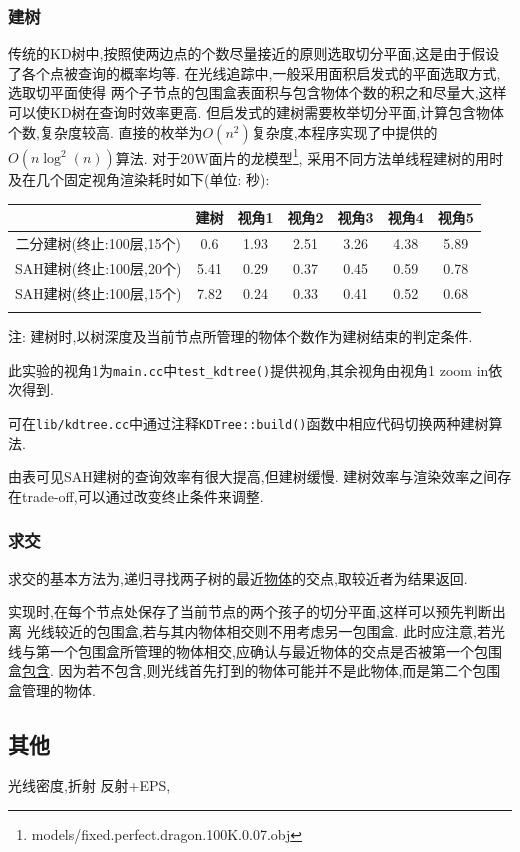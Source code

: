 \subsubsection{建树}
传统的KD树中,按照使两边点的个数尽量接近的原则选取切分平面,这是由于假设了各个点被查询的概率均等.
在光线追踪中,一般采用面积启发式的平面选取方式\cite{kdtree},选取切平面使得
两个子节点的包围盒表面积与包含物体个数的积之和尽量大,这样可以使KD树在查询时效率更高.
但启发式的建树需要枚举切分平面,计算包含物体个数,复杂度较高.
直接的枚举为$ O(n^2)$复杂度,本程序实现了\cite{kdtree}中提供的$ O(n \log^2(n))$算法.
对于20W面片的龙模型\footnote{models/fixed.perfect.dragon.100K.0.07.obj},
采用不同方法单线程建树的用时及在几个固定视角渲染耗时如下(单位: 秒):

\begin{table}[H]
  \begin{threeparttable}

    \begin{tabular}{c|c|c|c|c|c|c}
      \shline
      & 建树 & 视角1 & 视角2 & 视角3 & 视角4 & 视角5 \\ \hline
      二分建树(终止:100层,15个)  & 0.6  & 1.93  & 2.51  & 3.26  & 4.38  & 5.89  \\ \hline
      SAH建树(终止:100层,20个) & 5.41 & 0.29  & 0.37  & 0.45  & 0.59  & 0.78    \\ \hline
      SAH建树(终止:100层,15个) & 7.82 & 0.24  & 0.33  & 0.41  & 0.52  & 0.68    \\ \shline
    \end{tabular}
    \begin{tablenotes}
      \footnotesize
    \item 注: 建树时,以树深度及当前节点所管理的物体个数作为建树结束的判定条件.
    \item 此实验的视角1为\verb|main.cc|中\verb|test_kdtree()|提供视角,其余视角由视角1 zoom in依次得到.
    \item 可在\verb|lib/kdtree.cc|中通过注释\verb|KDTree::build()|函数中相应代码切换两种建树算法.
    \end{tablenotes}
  \end{threeparttable}
\end{table}

由表可见SAH建树的查询效率有很大提高,但建树缓慢. 建树效率与渲染效率之间存在trade-off,可以通过改变终止条件来调整.

\subsubsection{求交}
求交的基本方法为,递归寻找两子树的最近\underline{物体}的交点,取较近者为结果返回.

实现时,在每个节点处保存了当前节点的两个孩子的切分平面,这样可以预先判断出离
光线较近的包围盒,若与其内物体相交则不用考虑另一包围盒.
此时应注意,若光线与第一个包围盒所管理的物体相交,应确认与最近物体的交点是否被第一个包围盒\underline{包含}.
因为若不包含,则光线首先打到的物体可能并不是此物体,而是第二个包围盒管理的物体.



\subsection{其他}
光线密度,折射
反射+EPS,
